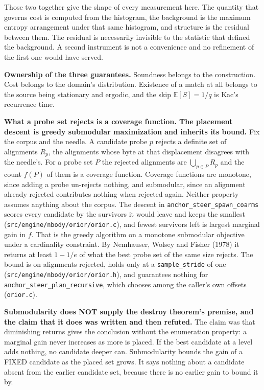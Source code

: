 Those two together give the shape of every measurement here. The quantity that governs cost is computed from the histogram, the background is the maximum entropy arrangement under that same histogram, and structure is the residual between them. The residual is necessarily invisible to the statistic that defined the background. A second instrument is not a convenience and no refinement of the first one would have served.

\textbf{Ownership of the three guarantees.} Soundness belongs to the construction. Cost belongs to the domain's distribution. Existence of a match at all belongs to the source being stationary and ergodic, and the skip \(\mathbb{E}[S] = 1/q\) is Kac's recurrence time.

\textbf{What a probe set rejects is a coverage function. The placement descent is greedy submodular maximization and inherits its bound.} Fix the corpus and the needle. A candidate probe \(p\) rejects a definite set of alignments \(R_p\), the alignments whose byte at that displacement disagrees with the needle's. For a probe set \(P\) the rejected alignments are \(\bigcup_{p \in P} R_p\) and the count \(f(P)\) of them is a coverage function. Coverage functions are monotone, since adding a probe un-rejects nothing, and submodular, since an alignment already rejected contributes nothing when rejected again. Neither property assumes anything about the corpus. The descent in \texttt{anchor\_steer\_spawn\_coarms} scores every candidate by the survivors it would leave and keeps the smallest (\texttt{src/\allowbreak{}engine/\allowbreak{}nbody/\allowbreak{}orior/\allowbreak{}orior.c}), and fewest survivors left is largest marginal gain in \(f\). That is the greedy algorithm on a monotone submodular objective under a cardinality constraint. By Nemhauser, Wolsey and Fisher (1978) it returns at least \(1 - 1/e\) of what the best probe set of the same size rejects. The bound is on alignments rejected, holds only at a \texttt{sample\_stride} of one (\texttt{src/\allowbreak{}engine/\allowbreak{}nbody/\allowbreak{}orior/\allowbreak{}orior.h}), and guarantees nothing for \texttt{anchor\_steer\_plan\_recursive}, which chooses among the caller's own offsets (\texttt{orior.c}).

\textbf{Submodularity does NOT supply the destroy theorem's premise, and the claim that it does was written and then refuted.} The claim was that diminishing returns gives the conclusion without the enumeration property: a marginal gain never increases as more is placed. If the best candidate at a level adds nothing, no candidate deeper can. Submodularity bounds the gain of a FIXED candidate as the placed set grows. It says nothing about a candidate absent from the earlier candidate set, because there is no earlier gain to bound it by.

